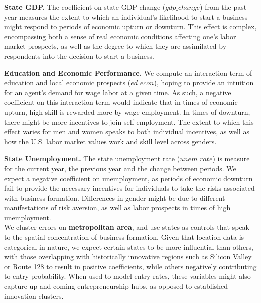 \textbf{State GDP.} The coefficient on state GDP change ($gdp\_change$) from the past year measures the extent to which an individual's likelihood to start a business might respond to periods of economic upturn or downturn. This effect is complex, encompassing both a sense of real economic conditions affecting one's labor market prospects, as well as the degree to which they are assimilated by respondents into the decision to start a business.

\textbf{Education and Economic Performance.} We compute an interaction term of education and local economic prospects ($ed\_econ$), hoping to provide an intuition for an agent's demand for wage labor at a given time. As such, a negative coefficient on this interaction term would indicate that in times of economic upturn, high skill is rewarded more by wage employment. In times of downturn, there might be more incentives to join self-employment. The extent to which this effect varies for men and women speaks to both individual incentives, as well as how the U.S. labor market values work and skill level across genders. 

\textbf{State Unemployment.} The state unemployment rate ($unem\_rate$) is measure for the current year, the previous year and the change between periods. We expect a negative coefficient on unemployment, as periods of economic downturn fail to provide the necessary incentives for individuals to take the risks associated with business formation. Differences in gender might be due to different manifestations of risk aversion, as well as labor prospects in times of high unemployment. \\

We cluster errors on \textbf{metropolitan area}, and use states as controls that speak to the spatial concentration of business formation. Given that location data is categorical in nature, we expect certain states to be more influential than others, with those overlapping with historically innovative regions such as Silicon Valley or Route 128 to result in positive coefficients, while others negatively contributing to entry probability. When used to model entry rates, these variables might also capture up-and-coming entrepreneurship hubs, as opposed to established innovation clusters. 
































